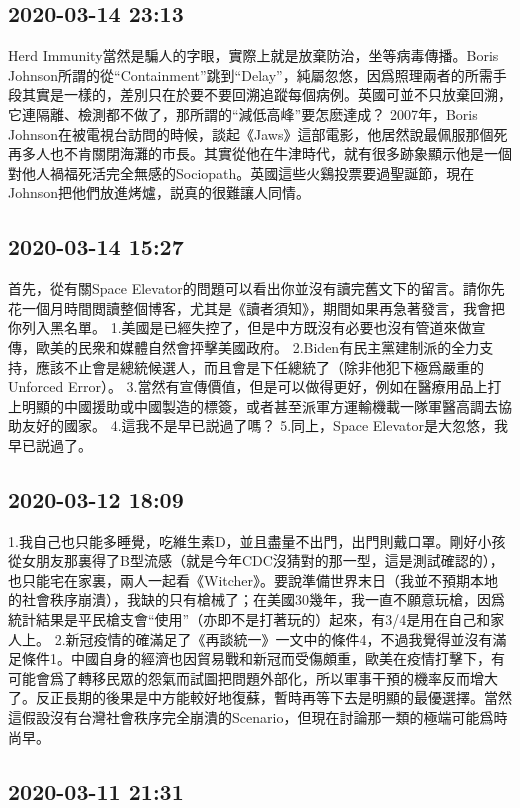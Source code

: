 \documentclass[twocolumn]{ctexart}
\begin{document}
\subsection*{2020-03-14 23:13}

Herd Immunity當然是騙人的字眼，實際上就是放棄防治，坐等病毒傳播。Boris Johnson所謂的從“Containment”跳到“Delay”，純屬忽悠，因爲照理兩者的所需手段其實是一樣的，差別只在於要不要回溯追蹤每個病例。英國可並不只放棄回溯，它連隔離、檢測都不做了，那所謂的“減低高峰”要怎麽達成？
2007年，Boris Johnson在被電視台訪問的時候，談起《Jaws》這部電影，他居然說最佩服那個死再多人也不肯關閉海灘的市長。其實從他在牛津時代，就有很多跡象顯示他是一個對他人禍福死活完全無感的Sociopath。英國這些火鷄投票要過聖誕節，現在Johnson把他們放進烤爐，説真的很難讓人同情。
\subsection*{2020-03-14 15:27}

首先，從有關Space Elevator的問題可以看出你並沒有讀完舊文下的留言。請你先花一個月時間閲讀整個博客，尤其是《讀者須知》，期間如果再急著發言，我會把你列入黑名單。
1.美國是已經失控了，但是中方既沒有必要也沒有管道來做宣傳，歐美的民衆和媒體自然會抨擊美國政府。
2.Biden有民主黨建制派的全力支持，應該不止會是總統候選人，而且會是下任總統了（除非他犯下極爲嚴重的Unforced Error）。
3.當然有宣傳價值，但是可以做得更好，例如在醫療用品上打上明顯的中國援助或中國製造的標簽，或者甚至派軍方運輸機載一隊軍醫高調去協助友好的國家。
4.這我不是早已説過了嗎？
5.同上，Space Elevator是大忽悠，我早已説過了。
\subsection*{2020-03-12 18:09}

1.我自己也只能多睡覺，吃維生素D，並且盡量不出門，出門則戴口罩。剛好小孩從女朋友那裏得了B型流感（就是今年CDC沒猜對的那一型，這是測試確認的），也只能宅在家裏，兩人一起看《Witcher》。要說準備世界末日（我並不預期本地的社會秩序崩潰），我缺的只有槍械了；在美國30幾年，我一直不願意玩槍，因爲統計結果是平民槍支會“使用”（亦即不是打著玩的）起來，有3/4是用在自己和家人上。
2.新冠疫情的確滿足了《再談統一》一文中的條件4，不過我覺得並沒有滿足條件1。中國自身的經濟也因貿易戰和新冠而受傷頗重，歐美在疫情打擊下，有可能會爲了轉移民眾的怨氣而試圖把問題外部化，所以軍事干預的機率反而增大了。反正長期的後果是中方能較好地復蘇，暫時再等下去是明顯的最優選擇。當然這假設沒有台灣社會秩序完全崩潰的Scenario，但現在討論那一類的極端可能爲時尚早。
\subsection*{2020-03-11 21:31}
\end{document}
